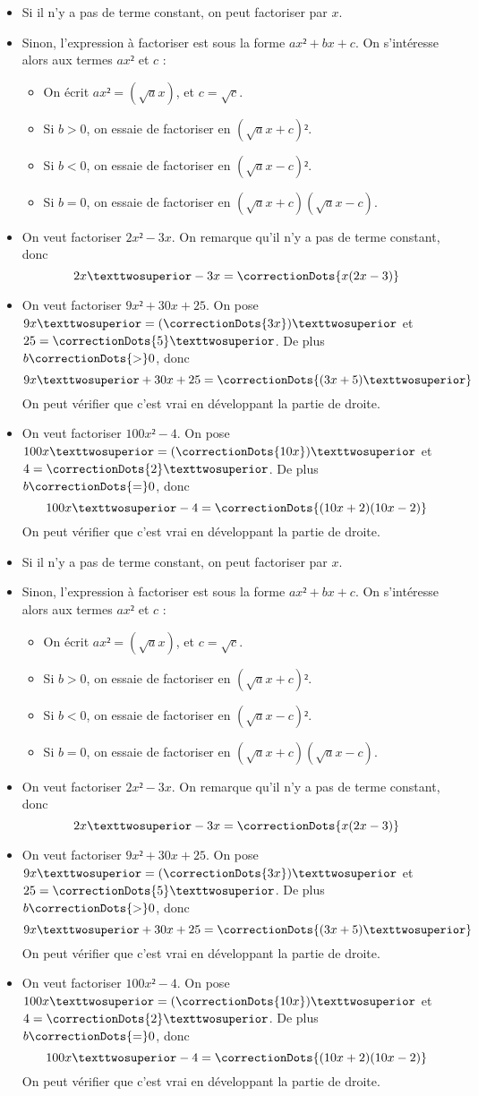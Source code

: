 \documentclass[noheader]{coursclass}
\begin{document}
\newcommand{\Technique}{
	\begin{greybox}[frametitle={Techniques de factorisation}]
		\begin{itemize}
			\item Si il n'y a pas de terme constant, on peut factoriser par $x$.
			\item Sinon, l'expression à factoriser est sous la forme $ax² + bx + c$. On s'intéresse alors aux termes $ax²$ et $c$ :
			      \begin{itemize}
				      \item On écrit $ax² = (\sqrt{a}x)$, et $c = \sqrt{c}$.
				      \item Si $b > 0$, on essaie de factoriser en $(\sqrt{a}x + c)²$.
				      \item Si $b < 0$, on essaie de factoriser en $(\sqrt{a}x - c)²$.
				      \item Si $b = 0$, on essaie de factoriser en $(\sqrt{a}x + c)(\sqrt{a}x - c)$.
			      \end{itemize}
		\end{itemize}
	\end{greybox}

	\begin{exemple}
		\begin{itemize}
			\item On veut factoriser $2x² - 3x$. On remarque qu'il n'y a pas de terme constant, donc
			      $$2x² - 3x = \correctionDots{x(2x - 3)}$$
			\item On veut factoriser $9x² + 30x + 25$. On pose $9x² = (\correctionDots{3x})²$ et $25 = \correctionDots{5}²$. De plus $b \correctionDots{>} 0$, donc
			      $$ 9x² + 30x + 25 = \correctionDots{(3x + 5)²} $$
			      On peut vérifier que c'est vrai en développant la partie de droite.
			\item On veut factoriser $100x² - 4$. On pose $100x² = (\correctionDots{10x})²$ et $4 = \correctionDots{2}²$. De plus $b \correctionDots{=} 0$, donc
			      $$ 100x² - 4 = \correctionDots{(10x + 2)(10x - 2)} $$
			      On peut vérifier que c'est vrai en développant la partie de droite.
		\end{itemize}
	\end{exemple}
}

\Technique

\vfill

\Technique
\end{document}
